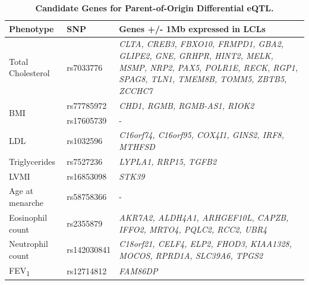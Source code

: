 \begin{table}
\centering
\begin{adjustbox}{width={\textwidth}}
\begin{tabular}{@{}p{5cm}|p{5cm}|p{10cm}@{}}
\toprule Phenotype & SNP & Genes +/- 1Mb expressed in LCLs \\ \midrule
Total Cholesterol & rs7033776 & \emph{CLTA, CREB3, FBXO10, FRMPD1, GBA2, GLIPE2, GNE, GRHPR, HINT2, MELK, MSMP, NRP2, PAX5, POLR1E, RECK, RGP1, SPAG8, TLN1, TMEM8B, TOMM5, ZBTB5, ZCCHC7} \\ \hline
\multirow{2}{5cm}{BMI} & rs77785972 & \emph{CHD1, RGMB, RGMB-AS1, RIOK2} \\ \cline{2-3}
 &  rs17605739	 & - \\ \hline
LDL & rs1032596 & \emph{C16orf74, C16orf95, COX4I1, GINS2, IRF8, MTHFSD}\\ \hline
Triglycerides & rs7527236 & \emph{LYPLA1, RRP15, TGFB2}\\ \hline
LVMI	 & rs16853098 & \emph{STK39} \\ \hline
Age at menarche & rs58758366 & -\\ \hline
Eosinophil count & rs2355879 & \emph{AKR7A2, ALDH4A1, ARHGEF10L, CAPZB, IFFO2, MRTO4, PQLC2, RCC2, UBR4}\\ \hline
Neutrophil count & rs142030841 & \emph{C18orf21, CELF4, ELP2, FHOD3, KIAA1328, MOCOS, RPRD1A, SLC39A6, TPGS2} \\ \hline
FEV\textsubscript{1} & rs12714812 & \emph{FAM86DP} \\ \bottomrule
\end{tabular}
\end{adjustbox}
\caption[Candidate Genes for Parent-of-Origin Differential eQTL. ]{\textbf{Candidate Genes for Parent-of-Origin Differential eQTL.}}
\label{tab:tab-s4}
\end{table}


